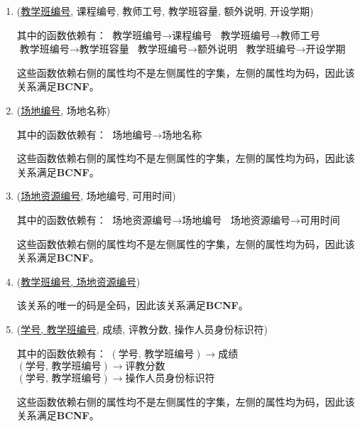 \begin{enumerate}
    \item (\uline{教学班编号}, 课程编号, 教师工号, 教学班容量, 额外说明, 开设学期) \par
    其中的函数依赖有： \newline
    $\text{教学班编号} \rightarrow \text{课程编号}$ \newline
    $\text{教学班编号} \rightarrow \text{教师工号}$ \newline
    $\text{教学班编号} \rightarrow \text{教学班容量}$ \newline
    $\text{教学班编号} \rightarrow \text{额外说明}$ \newline
    $\text{教学班编号} \rightarrow \text{开设学期}$ \par
    这些函数依赖右侧的属性均不是左侧属性的字集，左侧的属性均为码，因此该关系满足\textbf{BCNF}。
    
    \item (\uline{场地编号}, 场地名称) \par
    其中的函数依赖有： \newline
    $\text{场地编号} \rightarrow \text{场地名称}$ \par
    这些函数依赖右侧的属性均不是左侧属性的字集，左侧的属性均为码，因此该关系满足\textbf{BCNF}。
    
    \item (\uline{场地资源编号}, 场地编号, 可用时间) \par
    其中的函数依赖有： \newline
    $\text{场地资源编号} \rightarrow \text{场地编号}$ \newline
    $\text{场地资源编号} \rightarrow \text{可用时间}$ \par
    这些函数依赖右侧的属性均不是左侧属性的字集，左侧的属性均为码，因此该关系满足\textbf{BCNF}。
    
    \item (\uline{教学班编号, 场地资源编号}) \par
    该关系的唯一的码是全码，因此该关系满足\textbf{BCNF}。
    
    \item (\uline{学号, 教学班编号}, 成绩, 评教分数, 操作人员身份标识符) \par
    其中的函数依赖有： \newline
    $(\text{学号, 教学班编号}) \rightarrow \text{成绩}$ \newline
    $(\text{学号, 教学班编号}) \rightarrow \text{评教分数}$ \newline
    $(\text{学号, 教学班编号}) \rightarrow \text{操作人员身份标识符}$ \par
    这些函数依赖右侧的属性均不是左侧属性的字集，左侧的属性均为码，因此该关系满足\textbf{BCNF}。
    

\end{enumerate}
